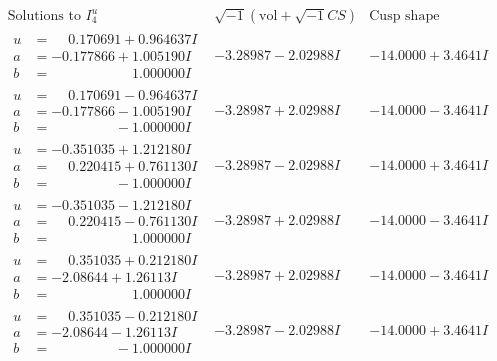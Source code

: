 \documentclass[1p]{elsarticle_modified}
\theoremstyle{definition}
\newcommand{\I}{\sqrt{-1}}
\begin{document}
$$\begin{array}{c|c|c}  
\text{Solutions to }I^u_{4}& \I (\text{vol} + \sqrt{-1}CS) & \text{Cusp shape}\\
 \hline 
\begin{aligned}
u &= \phantom{-}0.170691 + 0.964637 I \\
a &= -0.177866 + 1.005190 I \\
b &= \phantom{-0.000000 -}1.000000 I\end{aligned}
 & -3.28987 - 2.02988 I & -14.0000 + 3.4641 I \\ \hline\begin{aligned}
u &= \phantom{-}0.170691 - 0.964637 I \\
a &= -0.177866 - 1.005190 I \\
b &= \phantom{-0.000000 } -1.000000 I\end{aligned}
 & -3.28987 + 2.02988 I & -14.0000 - 3.4641 I \\ \hline\begin{aligned}
u &= -0.351035 + 1.212180 I \\
a &= \phantom{-}0.220415 + 0.761130 I \\
b &= \phantom{-0.000000 } -1.000000 I\end{aligned}
 & -3.28987 - 2.02988 I & -14.0000 + 3.4641 I \\ \hline\begin{aligned}
u &= -0.351035 - 1.212180 I \\
a &= \phantom{-}0.220415 - 0.761130 I \\
b &= \phantom{-0.000000 -}1.000000 I\end{aligned}
 & -3.28987 + 2.02988 I & -14.0000 - 3.4641 I \\ \hline\begin{aligned}
u &= \phantom{-}0.351035 + 0.212180 I \\
a &= -2.08644 + 1.26113 I \\
b &= \phantom{-0.000000 -}1.000000 I\end{aligned}
 & -3.28987 + 2.02988 I & -14.0000 - 3.4641 I \\ \hline\begin{aligned}
u &= \phantom{-}0.351035 - 0.212180 I \\
a &= -2.08644 - 1.26113 I \\
b &= \phantom{-0.000000 } -1.000000 I\end{aligned}
 & -3.28987 - 2.02988 I & -14.0000 + 3.4641 I \\ \hline\begin{aligned}

\end{aligned}
\end{array}$$
\end{document}
